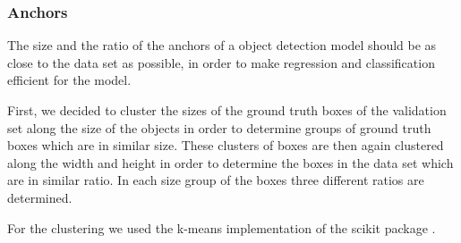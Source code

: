 \documentclass{article}
\begin{document}
\subsubsection*{Anchors}

The size and the ratio of the anchors of a object detection model should be as close to the data set as possible, in order to make regression and classification efficient for the model.

First, we decided to cluster the sizes of the ground truth boxes of the validation set along the size of the objects in order to determine groups of ground truth boxes which are in similar size. These clusters of boxes are then again clustered along the width and height in order to determine the boxes in the data set which are in similar ratio. In each size group of the boxes three different ratios are determined.

For the clustering we used the k-means implementation of the scikit package \cite{scikit-learn}.
\end{document}
